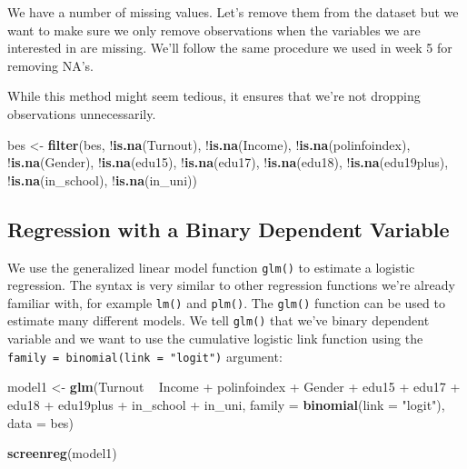 \documentclass[]{article}
\newenvironment{Shaded}{\begin{snugshade}}{\end{snugshade}}
\newcommand{\KeywordTok}[1]{\textcolor[rgb]{0.13,0.29,0.53}{\textbf{{#1}}}}
\newcommand{\DataTypeTok}[1]{\textcolor[rgb]{0.13,0.29,0.53}{{#1}}}
\newcommand{\StringTok}[1]{\textcolor[rgb]{0.31,0.60,0.02}{{#1}}}
\newcommand{\NormalTok}[1]{{#1}}
\theoremstyle{definition}
\theoremstyle{definition}
\theoremstyle{remark}
\begin{document}
We have a number of missing values. Let's remove them from the dataset
but we want to make sure we only remove observations when the variables
we are interested in are missing. We'll follow the same procedure we
used in week 5 for removing NA's.

While this method might seem tedious, it ensures that we're not dropping
observations unnecessarily.

\begin{Shaded}
\begin{Highlighting}[]
\NormalTok{bes <-}\StringTok{ }\KeywordTok{filter}\NormalTok{(bes, }
              \NormalTok{!}\KeywordTok{is.na}\NormalTok{(Turnout), }
              \NormalTok{!}\KeywordTok{is.na}\NormalTok{(Income), }
              \NormalTok{!}\KeywordTok{is.na}\NormalTok{(polinfoindex), }
              \NormalTok{!}\KeywordTok{is.na}\NormalTok{(Gender), }
              \NormalTok{!}\KeywordTok{is.na}\NormalTok{(edu15), }
              \NormalTok{!}\KeywordTok{is.na}\NormalTok{(edu17), }
              \NormalTok{!}\KeywordTok{is.na}\NormalTok{(edu18), }
              \NormalTok{!}\KeywordTok{is.na}\NormalTok{(edu19plus), }
              \NormalTok{!}\KeywordTok{is.na}\NormalTok{(in_school), }
              \NormalTok{!}\KeywordTok{is.na}\NormalTok{(in_uni))}
\end{Highlighting}
\end{Shaded}

\subsection{Regression with a Binary Dependent
Variable}\label{regression-with-a-binary-dependent-variable}

We use the generalized linear model function \texttt{glm()} to estimate
a logistic regression. The syntax is very similar to other regression
functions we're already familiar with, for example \texttt{lm()} and
\texttt{plm()}. The \texttt{glm()} function can be used to estimate many
different models. We tell \texttt{glm()} that we've binary dependent
variable and we want to use the cumulative logistic link function using
the \texttt{family\ =\ binomial(link\ =\ "logit")} argument:

\begin{Shaded}
\begin{Highlighting}[]
\NormalTok{model1 <-}\StringTok{ }\KeywordTok{glm}\NormalTok{(Turnout ~}\StringTok{ }\NormalTok{Income +}\StringTok{ }\NormalTok{polinfoindex +}\StringTok{ }\NormalTok{Gender +}\StringTok{ }
\StringTok{                }\NormalTok{edu15 +}\StringTok{ }\NormalTok{edu17 +}\StringTok{ }\NormalTok{edu18 +}\StringTok{ }\NormalTok{edu19plus +}\StringTok{ }\NormalTok{in_school +}\StringTok{ }\NormalTok{in_uni, }
              \DataTypeTok{family =} \KeywordTok{binomial}\NormalTok{(}\DataTypeTok{link =} \StringTok{"logit"}\NormalTok{),}
              \DataTypeTok{data =} \NormalTok{bes)}

\KeywordTok{screenreg}\NormalTok{(model1)}
\end{Highlighting}
\end{Shaded}
\end{document}
